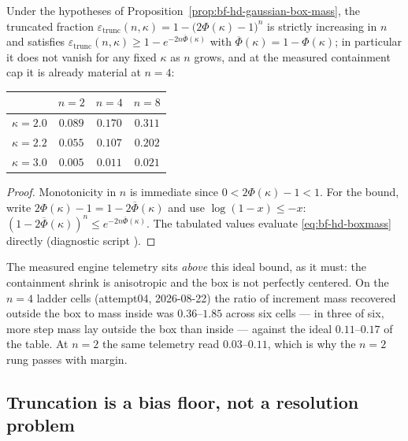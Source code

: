 \begin{proposition}
\label{prop:bf-hd-truncation-growth}
Under the hypotheses of Proposition~\ref{prop:bf-hd-gaussian-box-mass},
the truncated fraction
\(\varepsilon_{\mathrm{trunc}}(n,\kappa)
 =1-\bigl(2\Phi(\kappa)-1\bigr)^{n}\)
is strictly increasing in \(n\) and satisfies
\(\varepsilon_{\mathrm{trunc}}(n,\kappa)\ge
 1-e^{-2n\overline{\Phi}(\kappa)}\)
with \(\overline{\Phi}(\kappa)=1-\Phi(\kappa)\); in particular it does
not vanish for any fixed \(\kappa\) as \(n\) grows, and at the measured
containment cap it is already material at \(n=4\):
\begin{center}
\begin{tabular}{lccc}
\toprule
 & \(n=2\) & \(n=4\) & \(n=8\)\\
\midrule
\(\kappa=2.0\) & \(0.089\) & \(0.170\) & \(0.311\)\\
\(\kappa=2.2\) & \(0.055\) & \(0.107\) & \(0.202\)\\
\(\kappa=3.0\) & \(0.005\) & \(0.011\) & \(0.021\)\\
\bottomrule
\end{tabular}
\end{center}
\end{proposition}

\begin{proof}
Monotonicity in \(n\) is immediate since
\(0<2\Phi(\kappa)-1<1\).  For the bound, write
\(2\Phi(\kappa)-1=1-2\overline{\Phi}(\kappa)\) and use
\(\log(1-x)\le -x\):
\((1-2\overline{\Phi}(\kappa))^{n}\le e^{-2n\overline{\Phi}(\kappa)}\).
The tabulated values evaluate \eqref{eq:bf-hd-boxmass} directly
(diagnostic script ).
\end{proof}

The measured engine telemetry sits \emph{above} this ideal bound, as it
must: the containment shrink is anisotropic and the box is not perfectly
centered.  On the \(n=4\) ladder cells (attempt04, 2026-08-22) the ratio
of increment mass recovered outside the box to mass inside was
\(0.36\)--\(1.85\) across six cells --- in three of six, more step mass
lay outside the box than inside --- against the ideal
\(0.11\)--\(0.17\) of the table.  At \(n=2\) the same telemetry read
\(0.03\)--\(0.11\), which is why the \(n=2\) rung passes with margin.

\subsection{Truncation is a bias floor, not a resolution problem}

